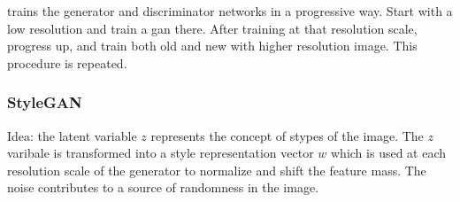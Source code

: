 \documentclass[11pt]{article}
\begin{document}
\begin{figure}[H]
    \centering
\end{figure}

trains the generator and discriminator networks in a progressive way. Start with a low resolution and train a gan there. After training at that resolution scale, progress up, and train both old and new with higher resolution image. This procedure is repeated.

\subsubsection{StyleGAN}

\begin{figure}[H]
    \centering
\end{figure}

Idea: the latent variable $z$ represents the concept of stypes of the image. The $z$ varibale is transformed into a style representation vector $w$ which is used at each resolution scale of the generator to normalize and shift the feature mass. The noise contributes to a source of randomness in the image. 
\end{document}
